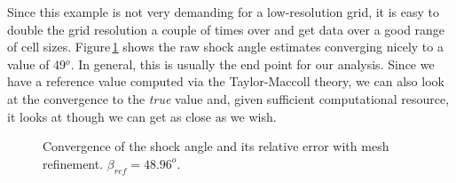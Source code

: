 \medskip
Since this example is not very demanding for a low-resolution grid, 
it is easy to double the grid resolution a couple of times over and get
data over a good range of cell sizes.
Figure\,\ref{cone20-grid-convergence-fig} shows the raw shock angle estimates
converging nicely to a value of 49$^o$.
In general, this is usually the end point for our analysis.
Since we have a reference value computed via the Taylor-Maccoll theory,
we can also look at the convergence to the \textit{true} value and,
given sufficient computational resource, 
it looks at though we can get as close as we wish.

\begin{figure}
 \centering
 \parbox{0.45\textwidth}{
 }
 \parbox{0.45\textwidth}{
 }
 \caption{Convergence of the shock angle and its relative error with mesh refinement.
          $\beta_{ref} = 48.96^o$.}
 \label{cone20-grid-convergence-fig}
\end{figure}


